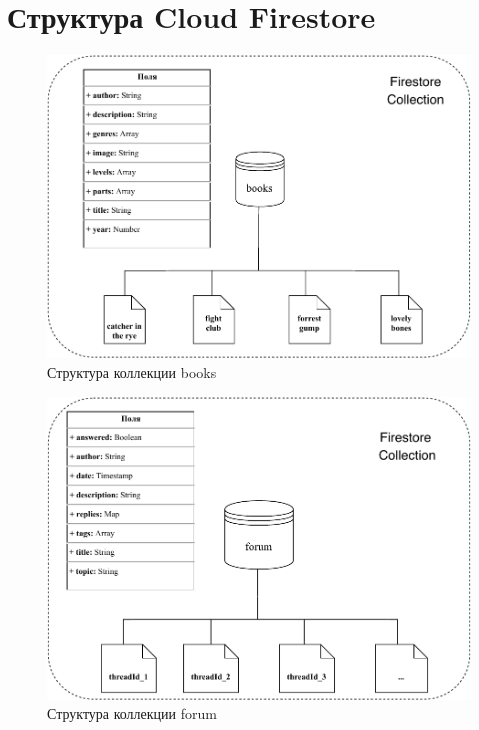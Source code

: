\chapter{Структура Cloud Firestore}
\label{cha:appendix1}

\begin{figure}[h]
	\centering
	\includegraphics[width=\textwidth, keepaspectratio]{figures/books}
	\caption{Структура коллекции books}
	\label{fig:booksDiagram}
\end{figure}

\begin{figure}[h]
	\centering
	\includegraphics[width=\textwidth, keepaspectratio]{figures/forum}
	\caption{Структура коллекции forum}
	\label{fig:forumDiagram}
\end{figure}

